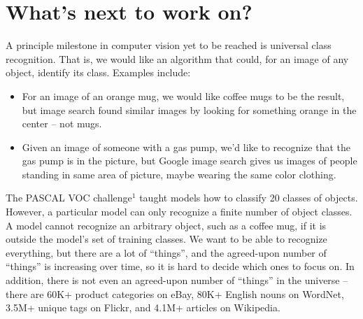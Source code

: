 \documentclass[11pt]{article}
\begin{document}
\section{What's next to work on?} 
A principle milestone in computer vision yet to be reached is universal class recognition. That is, we would like an algorithm that could, for an image of any object, identify its class.
Examples include:
\begin{itemize}
	\item For an image of an orange mug, we would like coffee mugs to be the result, but image search found similar images by looking for something orange in the center – not mugs.
    \item Given an image of someone with a gas pump, we'd like to recognize that the gas pump is in the picture, but Google image search gives us images of people standing in same area of picture, maybe wearing the same color clothing.
    \end{itemize}
The PASCAL VOC challenge$^1$ taught models how to classify 20 classes of objects.
However, a particular model can only recognize a finite number of object classes. A model cannot recognize an arbitrary object, such as a coffee mug, if it is outside the model's set of training classes. We want to be able to recognize everything, but there are a lot of ``things'', and the agreed-upon number of ``things'' is increasing over time, so it is hard to decide which ones to focus on. In addition, there is not even an agreed-upon number of ``things'' in the universe -- there are 60K+ product categories on eBay, 80K+ English nouns on WordNet, 3.5M+ unique tags on Flickr, and 4.1M+ articles on Wikipedia.\\
\end{document}
